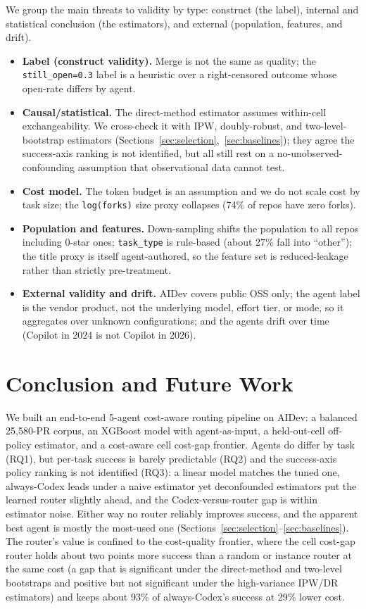 \documentclass[sigconf,nonacm]{acmart}
\begin{document}
We group the main threats to validity by type: construct (the label), internal and statistical conclusion (the estimators), and external (population, features, and drift).

\begin{itemize}
  \item \textbf{Label (construct validity).} Merge is not the same as quality; the \texttt{still\_open=0.3} label is a heuristic over a right-censored outcome whose open-rate differs by agent.
  \item \textbf{Causal/statistical.} The direct-method estimator assumes within-cell exchangeability. We cross-check it with IPW, doubly-robust, and two-level-bootstrap estimators (Sections~\ref{sec:selection},~\ref{sec:baselines}); they agree the success-axis ranking is not identified, but all still rest on a no-unobserved-confounding assumption that observational data cannot test.
  \item \textbf{Cost model.} The token budget is an assumption and we do not scale cost by task size; the \texttt{log(forks)} size proxy collapses (74\% of repos have zero forks).
  \item \textbf{Population and features.} Down-sampling shifts the population to all repos including 0-star ones; \texttt{task\_type} is rule-based (about 27\% fall into ``other''); the title proxy is itself agent-authored, so the feature set is reduced-leakage rather than strictly pre-treatment.
  \item \textbf{External validity and drift.} AIDev covers public OSS only; the agent label is the vendor product, not the underlying model, effort tier, or mode, so it aggregates over unknown configurations; and the agents drift over time (Copilot in 2024 is not Copilot in 2026).
\end{itemize}

\section{Conclusion and Future Work}\label{sec:conclusion}

We built an end-to-end 5-agent cost-aware routing pipeline on AIDev: a balanced 25,580-PR corpus, an XGBoost model with agent-as-input, a held-out-cell off-policy estimator, and a cost-aware cell cost-gap frontier. Agents do differ by task (RQ1), but per-task success is barely predictable (RQ2) and the success-axis policy ranking is not identified (RQ3): a linear model matches the tuned one, always-Codex leads under a naive estimator yet deconfounded estimators put the learned router slightly ahead, and the Codex-versus-router gap is within estimator noise. Either way no router reliably improves success, and the apparent best agent is mostly the most-used one (Sections~\ref{sec:selection}--\ref{sec:baselines}). The router's value is confined to the cost-quality frontier, where the cell cost-gap router holds about two points more success than a random or instance router at the same cost (a gap that is significant under the direct-method and two-level bootstraps and positive but not significant under the high-variance IPW/DR estimators) and keeps about 93\% of always-Codex's success at 29\% lower cost.
\end{document}
